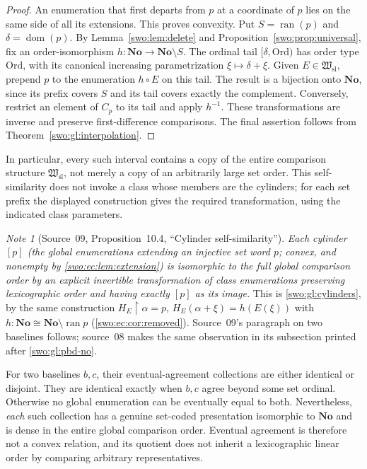 \documentclass[11pt]{article}
\theoremstyle{definition}
\theoremstyle{remark}
\newtheorem{note}[note]{Note}
\newcommand{\No}{\mathbf{No}}
\newcommand{\Ord}{\mathrm{Ord}}
\newcommand{\Hsl}{\mathfrak W_{\mathrm{sl}}}
\newcommand{\ran}{\operatorname{ran}}
\newcommand{\dom}{\operatorname{dom}}
\newcommand{\restr}{\mathbin{\upharpoonright}}
\begin{document}
\begin{proof}
An enumeration that first departs from $p$ at a coordinate of $p$ lies on the
same side of all its extensions.  This proves convexity.  Put
$S=\ran(p)$ and $\delta=\dom(p)$.  By Lemma~\ref{swo:lem:delete} and
Proposition~\ref{swo:prop:universal}, fix an order-isomorphism
$h:\No\to\No\setminus S$.  The ordinal tail $[\delta,\Ord)$ has order
type $\Ord$, with its canonical increasing parametrization
$\xi\mapsto\delta+\xi$.  Given $E\in\Hsl$, prepend $p$ to the enumeration
$h\circ E$ on this tail.  The result is a bijection onto $\No$, since its
prefix covers $S$ and its tail covers exactly the complement.  Conversely,
restrict an element of $C_p$ to its tail and apply $h^{-1}$.  These
transformations are inverse and preserve first-difference comparisons.
The final assertion follows from Theorem~\ref{swo:gl:interpolation}.
\end{proof}

In particular, every such interval contains a copy of the entire comparison
structure $\Hsl$, not merely a copy of an arbitrarily large set order.  This
self-similarity does not invoke a class whose members are the cylinders;
for each set prefix the displayed construction gives the required
transformation, using the indicated class parameters.


\begin{note}[Source~09, Proposition~10.4, ``Cylinder self-similarity'']\label{swo:ec:prop:cylinder}
\emph{Each cylinder $[p]$ (the global enumerations extending an injective set
word $p$; convex, and nonempty by \cref{swo:ec:lem:extension}) is isomorphic
to the full global comparison order by an explicit invertible transformation
of class enumerations preserving lexicographic order and having exactly $[p]$
as its image.} This is \cref{swo:gl:cylinders}, by the same construction
$H_E\restr\alpha=p$, $H_E(\alpha+\xi)=h(E(\xi))$ with $h:\No\cong\No\setminus\ran p$
(\cref{swo:ec:cor:removed}). Source~09's paragraph on two baselines follows;
source~08 makes the same observation in its subsection printed after
\cref{swo:gl:pbd-no}.
\end{note}

For two baselines $b,c$, their eventual-agreement collections are either
identical or disjoint. They are identical exactly when $b,c$ agree beyond
some set ordinal. Otherwise no global enumeration can be eventually
equal to both. Nevertheless, \emph{each} such collection has a genuine
set-coded presentation isomorphic to $\No$ and is dense in the entire
global comparison order. Eventual agreement is therefore not a convex
relation, and its quotient does not inherit a lexicographic linear order
by comparing arbitrary representatives.
\end{document}
